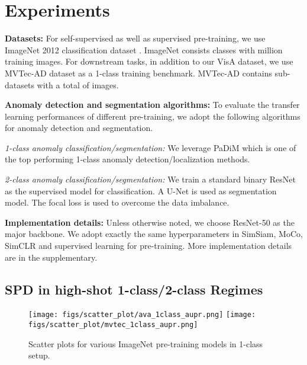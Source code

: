 \documentclass[runningheads]{llncs}
\begin{document}
\section{Experiments}\label{sec:exp}

\noindent\textbf{Datasets:} For self-supervised as well as supervised pre-training, we use ImageNet 2012 classification dataset \cite{deng2009imagenet}. ImageNet consists  classes with  million training images. For downstream tasks, in addition to our VisA dataset, we use MVTec-AD dataset \cite{bergmann2019mvtec} as a 1-class training benchmark. MVTec-AD contains  sub-datasets with a total of  images.

\noindent\textbf{Anomaly detection and segmentation algorithms:} To evaluate the transfer learning performances of different pre-training, we adopt the following algorithms for anomaly detection and segmentation. 

\noindent\emph{1-class anomaly classification/segmentation:} We leverage PaDiM \cite{defard2021padim} which is one of the top performing 1-class anomaly detection/localization methods. 

\noindent\emph{2-class anomaly classification/segmentation:} We train a standard binary ResNet \cite{he2016deep} as the supervised model for classification. A U-Net \cite{ronneberger2015u} is used as segmentation model. The focal loss \cite{lin2017focal} is used to overcome the data imbalance. 

\noindent\textbf{Implementation details:} Unless otherwise noted, we choose ResNet-50 as the major backbone. We adopt exactly the same hyperparameters in SimSiam, MoCo, SimCLR and supervised learning for pre-training. More implementation details are in the supplementary.

\subsection{SPD in high-shot 1-class/2-class Regimes}
\begin{figure}[!t]
\centering
\texttt{[image: figs/scatter\_plot/ava\_1class\_aupr.png]}
\texttt{[image: figs/scatter\_plot/mvtec\_1class\_aupr.png]}\\
 \caption{Scatter plots for various ImageNet pre-training models in 1-class setup.}
 \label{fig:scatter}
\end{figure}
\end{document}

